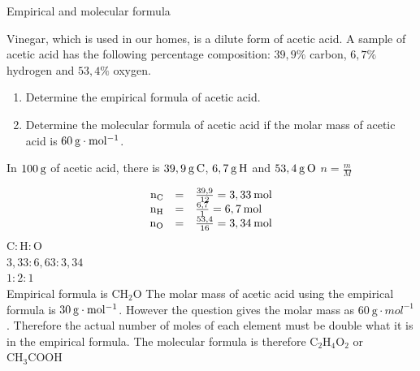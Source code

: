     \noindent
\label{m38712*secfhsst!!!underscore!!!id1308} \vspace{-3cm}
      \noindent 
      \begin{wex}{Empirical and molecular formula
      }
 {
     \label{m38712*probfhsst!!!underscore!!!id1310}
      \label{m38712*id281533}Vinegar, which is used in our homes, is a dilute form of acetic acid. A sample of acetic acid has the following percentage composition: $39,9\%$ carbon, $6,7\%$ hydrogen and $53,4\%$ oxygen.  
      \label{m38712*id281540}\begin{enumerate}[noitemsep, label=\textbf{\arabic*}. ] 
            \leftskip=20pt\rightskip=\leftskip\label{m38712*uid71}\item Determine the empirical formula of acetic acid.
\label{m38712*uid72}\item Determine the molecular formula of acetic acid if the molar mass of acetic acid is $60\phantom{\rule{2pt}{0ex}}\text{g}\ensuremath{\cdot}\text{mol}{}^{-1}$.
\end{enumerate}
      \vspace{5pt}}
{
      \label{m38712*id281607}In $100\phantom{\rule{2pt}{0ex}}\text{g}$ of acetic acid, there is $39,9\phantom{\rule{2pt}{0ex}}\text{g}\phantom{\rule{2pt}{0ex}}\text{C}$, $6,7\phantom{\rule{2pt}{0ex}}\text{g}\phantom{\rule{2pt}{0ex}}\text{H}$ and $53,4\phantom{\rule{2pt}{0ex}}\text{g}\phantom{\rule{2pt}{0ex}}\text{O}$ 
      \label{m38712*id281633}
        $n=\frac{m}{M}$
      
      \label{m38712*id281653}\nopagebreak\noindent{}
        
    \begin{equation*}
    \begin{array}{ccc}\hfill {\text{n}}_{\text{C}}& =& \frac{39,9}{12}=3,33\phantom{\rule{2pt}{0ex}}\text{mol}\hfill \\ \hfill {\text{n}}_{\text{H}}& =& \frac{6,7}{1}=6,7\phantom{\rule{2pt}{0ex}}\text{mol}\hfill \\ \hfill {\text{n}}_{\text{O}}& =& \frac{53,4}{16}=3,34\phantom{\rule{2pt}{0ex}}\text{mol}\hfill \end{array}
      \end{equation*}
      \label{m38712*id281812}
$\text{C}:\text{H}:\text{O}$\\
$3,33:6,63:3,34$ \\
$1:2:1$\\
Empirical formula is $\text{CH}{}_{2}\text{O}$ 
      \label{m38712*id281834}The molar mass of acetic acid using the empirical formula is $30\phantom{\rule{2pt}{0ex}}\text{g}\ensuremath{\cdot}\text{mol}{}^{-1}$. However the question gives the molar mass as $60~\text{g}\cdot{mol}^{-1}$. Therefore the actual number of moles of each element must be double what it is in the empirical formula.
      \label{m38712*id281854}The molecular formula is therefore $\text{C}{}_{2}\text{H}{}_{4}\text{O}{}_{2}$ or $\text{CH}{}_{3}\text{COOH}$
}
    \end{wex}
